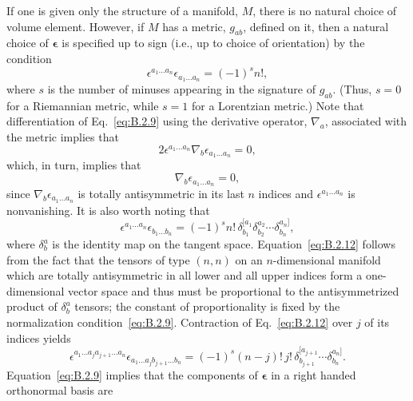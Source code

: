 If one is given only the structure of a manifold, \(M\), there is no natural choice of
volume element. However, if \(M\) has a metric, \(g_{ab}\), defined on it, then a
natural choice of \(\boldsymbol\epsilon\) is specified up to sign (i.e., up to choice
of orientation) by the condition
\begin{equation}
  \epsilon^{a_1\ldots a_n}\epsilon_{a_1\ldots a_n}=(-1)^s n!,
  \tag{B.2.9}\label{eq:B.2.9}
\end{equation}
where \(s\) is the number of minuses appearing in the signature of \(g_{ab}\). (Thus,
\(s=0\) for a Riemannian metric, while \(s=1\) for a Lorentzian metric.) Note that
differentiation of Eq.~\eqref{eq:B.2.9} using the derivative operator,
\(\nabla_a\), associated with the metric implies that
\begin{equation}
  2\epsilon^{a_1\ldots a_n}\nabla_b\epsilon_{a_1\ldots a_n}=0,
  \tag{B.2.10}\label{eq:B.2.10}
\end{equation}
which, in turn, implies that
\begin{equation}
  \nabla_b\epsilon_{a_1\ldots a_n}=0,
  \tag{B.2.11}\label{eq:B.2.11}
\end{equation}
since \(\nabla_b\epsilon_{a_1\ldots a_n}\) is totally antisymmetric in its last \(n\)
indices and \(\epsilon^{a_1\ldots a_n}\) is nonvanishing. It is also worth noting that
\begin{equation}
  \epsilon^{a_1\ldots a_n}\epsilon_{b_1\ldots b_n}
  =(-1)^s n!\,
  \delta^{[a_1}_{b_1}\delta^{a_2}_{b_2}\cdots\delta^{a_n]}_{b_n},
  \tag{B.2.12}\label{eq:B.2.12}
\end{equation}
where \(\delta^a_b\) is the identity map on the tangent space.
Equation~\eqref{eq:B.2.12} follows from the fact that the tensors of type \((n,n)\)
on an \(n\)-dimensional manifold which are totally antisymmetric in all lower and all
upper indices form a one-dimensional vector space and thus must be proportional to
the antisymmetrized product of \(\delta^a_b\) tensors; the constant of proportionality
is fixed by the normalization condition~\eqref{eq:B.2.9}. Contraction of
Eq.~\eqref{eq:B.2.12} over \(j\) of its indices yields
\begin{equation}
  \epsilon^{a_1\ldots a_j a_{j+1}\ldots a_n}
  \epsilon_{a_1\ldots a_j b_{j+1}\ldots b_n}
  =(-1)^s(n-j)!\,j!\,
  \delta^{[a_{j+1}}_{b_{j+1}}\cdots\delta^{a_n]}_{b_n}.
  \tag{B.2.13}\label{eq:B.2.13}
\end{equation}
Equation~\eqref{eq:B.2.9} implies that the components of
\(\boldsymbol\epsilon\) in a right handed orthonormal basis are

